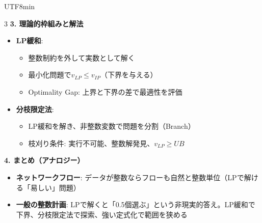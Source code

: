 \documentclass[8pt,a4paper]{article}
\begin{document}
\begin{CJK}{UTF8}{min}
\begin{multicols}{3}
\textbf{3. 理論的枠組みと解法}
\begin{itemize}
    \item \textbf{LP緩和}:
    \begin{itemize}
        \item 整数制約を外して実数として解く
        \item 最小化問題で$v_{LP} \leq v_{IP}$（下界を与える）
        \item Optimality Gap: 上界と下界の差で最適性を評価
    \end{itemize}
    \item \textbf{分枝限定法}:
    \begin{itemize}
        \item LP緩和を解き、非整数変数で問題を分割（Branch）
        \item 枝刈り条件: 実行不可能、整数解発見、$v_{LP} \geq UB$
    \end{itemize}
\end{itemize}

\textbf{4. まとめ（アナロジー）}
\begin{itemize}
    \item \textbf{ネットワークフロー}: データが整数ならフローも自然と整数単位（LPで解ける「易しい」問題）
    \item \textbf{一般の整数計画}: LPで解くと「0.5個選ぶ」という非現実的答え。LP緩和で下界、分枝限定法で探索、強い定式化で範囲を狭める
\end{itemize}

\end{multicols}

\end{CJK}
\end{document}
